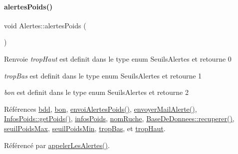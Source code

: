 \mbox{\label{class_alertes_ac4b8925cc6c262cf7254b1576ba07d33}} 
\paragraph{\texorpdfstring{alertes\+Poids()}{alertesPoids()}}
{\footnotesize\ttfamily void Alertes\+::alertes\+Poids (\begin{DoxyParamCaption}{ }\end{DoxyParamCaption})}

\begin{DoxyReturn}{Renvoie}
{\itshape trop\+Haut} est definit dans le type enum Seuils\+Alertes et retourne 0 

{\itshape trop\+Bas} est definit dans le type enum Seuils\+Alertes et retourne 1 

{\itshape bon} est definit dans le type enum Seuils\+Alertes et retourne 2 
\end{DoxyReturn}


Références \hyperlink{class_alertes_a91e58b69d29922e8e984efb767ae5268}{bdd}, \hyperlink{parametres_8h_aaa6de8207c94675264c90b10b613368da5ac8ec3b54d90a07c6bb5a77ef971821}{bon}, \hyperlink{class_alertes_a60f823014dcce3504ee1d78ac50b5328}{envoi\+Alertes\+Poids()}, \hyperlink{class_alertes_a375783502a78109f3323dc1ed90cfdc9}{envoyer\+Mail\+Alerte()}, \hyperlink{class_infos_poids_a902fb0222d3b2fa396987daed57377d2}{Infos\+Poids\+::get\+Poids()}, \hyperlink{class_alertes_add699ea1cebadb371f86b4c47ebe381d}{infos\+Poids}, \hyperlink{class_alertes_a212f2a7185bcc7b11f3e54200272bdcf}{nom\+Ruche}, \hyperlink{class_base_de_donnees_a77539baad389f5acf754cd2cd452403e}{Base\+De\+Donnees\+::recuperer()}, \hyperlink{class_alertes_a19b88c68325ccc6e5e8ad11a2537b25e}{seuil\+Poids\+Max}, \hyperlink{class_alertes_a3f23bee8122888916e33559f4d0bf34b}{seuil\+Poids\+Min}, \hyperlink{parametres_8h_aaa6de8207c94675264c90b10b613368da4257e2f8921856770c8266f55c937295}{trop\+Bas}, et \hyperlink{parametres_8h_aaa6de8207c94675264c90b10b613368dabc650d9700ae19f2696e6a6e3f9ab067}{trop\+Haut}.



Référencé par \hyperlink{class_alertes_ad04a02dcc6e6f14da0784c7054888b05}{appeler\+Les\+Alertes()}.


